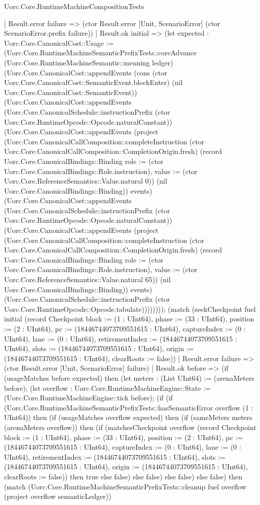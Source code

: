 \begin{lexlean}{Uorc.Core.RuntimeMachineCompositionTests}
\begin{semanticmodule}
{        | Result.error failure => (ctor Result.error [Unit, ScenarioError] (ctor ScenarioError.prefix failure))
        | Result.ok initial => (let expected : Uorc.Core.CanonicalCost::Usage := (Uorc.Core.RuntimeMachineSemanticPrefixTests::coreAdvance (Uorc.Core.RuntimeMachineSemantic::meaning ledger) (Uorc.Core.CanonicalCost::appendEvents (cons (ctor Uorc.Core.CanonicalCost::SemanticEvent.blockEnter) (nil Uorc.Core.CanonicalCost::SemanticEvent)) (Uorc.Core.CanonicalCost::appendEvents (Uorc.Core.CanonicalSchedule::instructionPrefix (ctor Uorc.Core.RuntimeOpcode::Opcode.naturalConstant)) (Uorc.Core.CanonicalCost::appendEvents (project (Uorc.Core.CanonicalCallComposition::completeInstruction (ctor Uorc.Core.CanonicalCallComposition::CompletionOrigin.fresh) (record Uorc.Core.CanonicalBindings::Binding {role := (ctor Uorc.Core.CanonicalBindings::Role.instruction), value := (ctor Uorc.Core.ReferenceSemantics::Value.natural 0)}) (nil Uorc.Core.CanonicalBindings::Binding)) events) (Uorc.Core.CanonicalCost::appendEvents (Uorc.Core.CanonicalSchedule::instructionPrefix (ctor Uorc.Core.RuntimeOpcode::Opcode.naturalConstant)) (Uorc.Core.CanonicalCost::appendEvents (project (Uorc.Core.CanonicalCallComposition::completeInstruction (ctor Uorc.Core.CanonicalCallComposition::CompletionOrigin.fresh) (record Uorc.Core.CanonicalBindings::Binding {role := (ctor Uorc.Core.CanonicalBindings::Role.instruction), value := (ctor Uorc.Core.ReferenceSemantics::Value.natural 65)}) (nil Uorc.Core.CanonicalBindings::Binding)) events) (Uorc.Core.CanonicalSchedule::instructionPrefix (ctor Uorc.Core.RuntimeOpcode::Opcode.tabulate)))))))); (match (seekCheckpoint fuel initial (record Checkpoint {block := (1 : UInt64), phase := (33 : UInt64), position := (2 : UInt64), pc := (18446744073709551615 : UInt64), captureIndex := (0 : UInt64), lane := (0 : UInt64), retirementIndex := (18446744073709551615 : UInt64), slots := (18446744073709551615 : UInt64), origin := (18446744073709551615 : UInt64), clearRoots := false}))
          | Result.error failure => (ctor Result.error [Unit, ScenarioError] failure)
          | Result.ok before => (if (usageMatches before expected) then (let meters : (List UInt64) := (arenaMeters before); (let overflow : Uorc.Core.RuntimeMachineEngine::State := (Uorc.Core.RuntimeMachineEngine::tick before); (if (if (Uorc.Core.RuntimeMachineSemanticPrefixTests::hasSemanticError overflow (1 : UInt64)) then (if (usageMatches overflow expected) then (if (sameMeters meters (arenaMeters overflow)) then (if (matchesCheckpoint overflow (record Checkpoint {block := (1 : UInt64), phase := (33 : UInt64), position := (2 : UInt64), pc := (18446744073709551615 : UInt64), captureIndex := (0 : UInt64), lane := (0 : UInt64), retirementIndex := (18446744073709551615 : UInt64), slots := (18446744073709551615 : UInt64), origin := (18446744073709551615 : UInt64), clearRoots := false})) then true else false) else false) else false) else false) then (match (Uorc.Core.RuntimeMachineSemanticPrefixTests::cleanup fuel overflow (project overflow semanticLedger))
}
\end{semanticmodule}
\end{lexlean}
